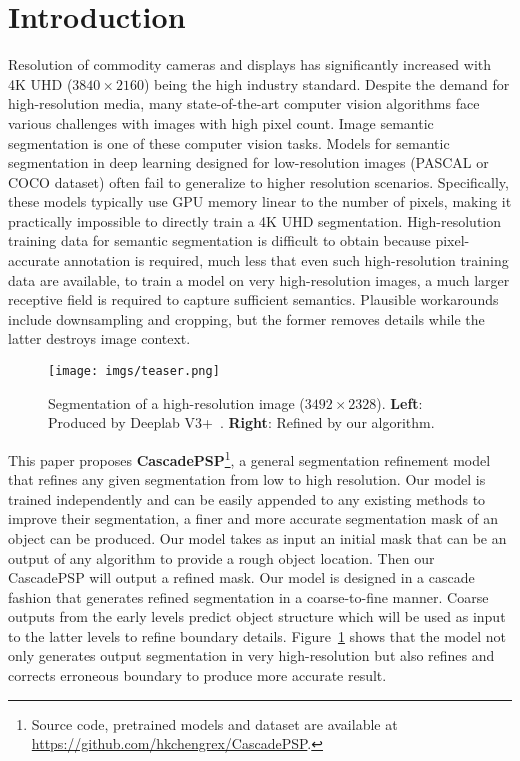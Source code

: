 \documentclass[10pt,twocolumn,letterpaper]{article}
\begin{document}
\section{Introduction}
Resolution of commodity cameras and displays has significantly increased with 4K UHD ($3840\times2160$) being the high industry standard. Despite the demand for high-resolution media, many state-of-the-art computer vision algorithms face various challenges with images with high pixel count. 
Image semantic segmentation is one of these computer vision tasks. 
Models for semantic segmentation in deep learning designed for low-resolution images (\eg PASCAL or COCO dataset) often fail to generalize to higher resolution scenarios. 
Specifically, these models typically use GPU memory linear to the number of pixels, making it practically impossible to directly train a 4K UHD segmentation. 
High-resolution training data for semantic segmentation is difficult to obtain because pixel-accurate annotation is required, much less that even such high-resolution training data are available, to train a model on very high-resolution images, a much larger receptive field is required to capture sufficient semantics. Plausible workarounds include downsampling and cropping, but the former removes details while the latter destroys image context.

\begin{figure}[t]
	\texttt{[image: imgs/teaser.png]}
	\label{fig:teaser}
	\caption{
	Segmentation of a high-resolution image ($3492 \times 2328$). \textbf{Left}: Produced by Deeplab V3+~\cite{chen2018encoder}. \textbf{Right}: Refined by our algorithm.}
	\vspace{-0.15in}
\end{figure}

This paper proposes \textbf{CascadePSP}\footnote{Source code,  pretrained models and dataset are available at \url{https://github.com/hkchengrex/CascadePSP}.}, a general segmentation refinement model that refines any given segmentation from low to high resolution. 
Our model is trained independently and can be easily appended to any existing methods to improve their segmentation, a finer and more accurate segmentation mask of an object can be produced. 
Our model takes as input an initial mask that can be an output of any algorithm to provide a rough object location. Then our CascadePSP will output a refined mask.
Our model is designed in a cascade fashion that generates refined segmentation in a coarse-to-fine manner. Coarse outputs from the early levels predict object structure which will be used as input to the latter levels to refine boundary details. 
Figure~\ref{fig:teaser} shows that the model not only generates output segmentation in very high-resolution but also refines and corrects erroneous boundary to produce more accurate result. 
\end{document}
